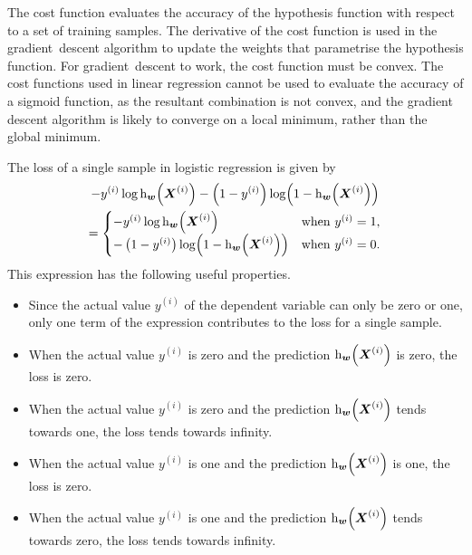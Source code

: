 The cost function evaluates the accuracy of the hypothesis function with respect to a set of training samples.
The derivative of the cost function is used in the gradient~descent algorithm to update the weights that parametrise the hypothesis function.
For gradient~descent to work, the cost function must be convex.
The cost functions used in linear regression cannot be used to evaluate the accuracy of a sigmoid function, as the resultant combination is not convex, and the gradient descent algorithm is likely to converge on a local minimum, rather than the global minimum.

The loss of a single sample in logistic regression is given by
\begin{multline*}
  - y^{(i)} \log \function[_{\boldsymbol{w}}]{h}{\boldsymbol{X}^{(i)}} - \left( 1 - y^{(i)} \right) \function{\log}{1 - \function[_{\boldsymbol{w}}]{h}{\boldsymbol{X}^{(i)}}} \\
  = \begin{cases}
    - y^{(i)} \log \function[_{\boldsymbol{w}}]{h}{\boldsymbol{X}^{(i)}} & \text{when } y^{(i)} = 1 \text{,} \\
    - \left( 1 - y^{(i)} \right) \function{\log}{1 - \function[_{\boldsymbol{w}}]{h}{\boldsymbol{X}^{(i)}}} & \text{when } y^{(i)} = 0 \text{.}
  \end{cases}
\end{multline*}
This expression has the following useful properties.
\begin{itemize}
  \item Since the actual value \( y^{(i)} \) of the dependent variable can only be zero or one, only one term of the expression contributes to the loss for a single sample.
  \item When the actual value \( y^{(i)} \) is zero and the prediction \( \function[_{\boldsymbol{w}}]{h}{\boldsymbol{X}^{(i)}} \) is zero, the loss is zero.
  \item When the actual value \( y^{(i)} \) is zero and the prediction \( \function[_{\boldsymbol{w}}]{h}{\boldsymbol{X}^{(i)}} \) tends towards one, the loss tends towards infinity.
  \item When the actual value \( y^{(i)} \) is one and the prediction \( \function[_{\boldsymbol{w}}]{h}{\boldsymbol{X}^{(i)}} \) is one, the loss is zero.
  \item When the actual value \( y^{(i)} \) is one and the prediction \( \function[_{\boldsymbol{w}}]{h}{\boldsymbol{X}^{(i)}} \) tends towards zero, the loss tends towards infinity.
\end{itemize}

